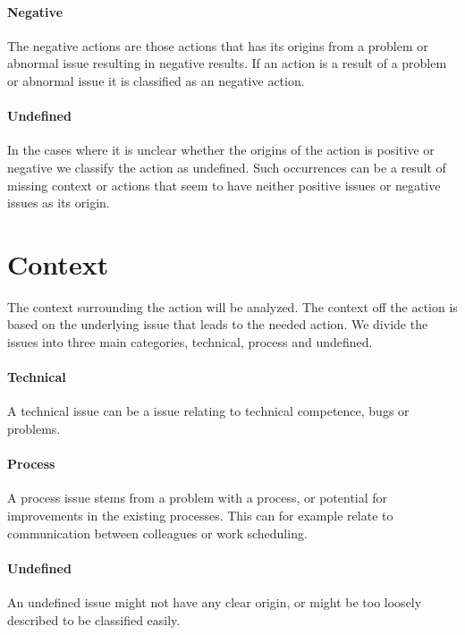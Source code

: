 \paragraph{Negative} The negative actions are those actions that has its origins from a problem or abnormal issue resulting in negative results. If an action is a result of a problem or abnormal issue it is classified as an negative action. 
\paragraph{Undefined} In the cases where it is unclear whether the origins of the action is positive or negative we classify the action as undefined. Such occurrences can be a result of missing context or actions that seem to have neither positive issues or negative issues as its origin. 

\section{Context}\label{method:context}
The context surrounding the action will be analyzed. The context off the action is based on the underlying issue that leads to the needed action. We divide the issues into three main categories, technical, process and undefined. 
\paragraph{Technical}
A technical issue can be a issue relating to technical competence, bugs or problems.
\paragraph{Process}
A process issue stems from a problem with a process, or potential for improvements in the existing processes. This can for example relate to communication between colleagues or work scheduling.
\paragraph{Undefined}
 An undefined issue might not have any clear origin, or might be too loosely described to be classified easily.

